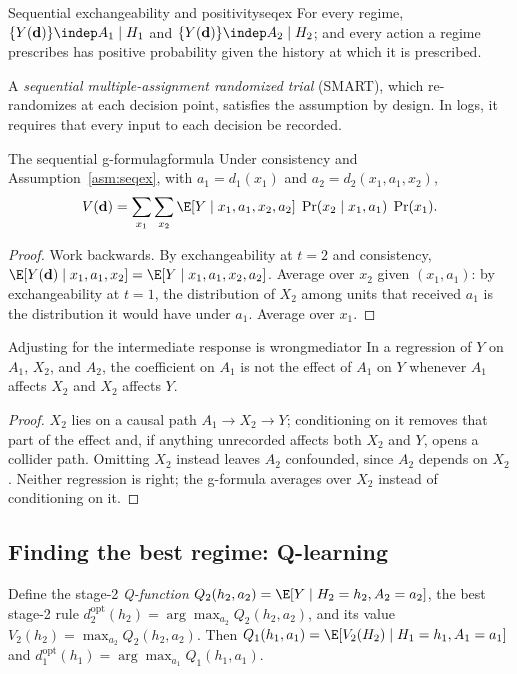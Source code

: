 \documentclass[11pt]{article}
\begin{document}
\begin{assum}{Sequential exchangeability and positivity}{seqex}
For every regime, $\{Y(\mathbf d)\} \indep A_1 \mid H_1$ and $\{Y(\mathbf d)\} \indep A_2 \mid H_2$; and every action a regime prescribes
has positive probability given the history at which it is prescribed.
\end{assum}

A \emph{sequential multiple-assignment randomized trial} (SMART), which re-randomizes at each decision point, satisfies the
assumption by design. In logs, it requires that every input to each decision be recorded.

\begin{prop}{The sequential g-formula}{gformula}
Under consistency and Assumption~\ref{asm:seqex}, with $a_1 = d_1(x_1)$ and $a_2 = d_2(x_1, a_1, x_2)$,
\[
  V(\mathbf d) = \sum_{x_1}\sum_{x_2} \E[Y \mid x_1, a_1, x_2, a_2]\;\Pr(x_2 \mid x_1, a_1)\;\Pr(x_1).
\]
\end{prop}
\begin{proof}
Work backwards. By exchangeability at $t = 2$ and consistency,
$\E[Y(\mathbf d) \mid x_1, a_1, x_2] = \E[Y \mid x_1, a_1, x_2, a_2]$. Average over $x_2$ given $(x_1, a_1)$: by exchangeability at
$t = 1$, the distribution of $X_2$ among units that received $a_1$ is the distribution it would have under $a_1$. Average
over $x_1$.
\end{proof}

\begin{prop}{Adjusting for the intermediate response is wrong}{mediator}
In a regression of $Y$ on $A_1$, $X_2$, and $A_2$, the coefficient on $A_1$ is not the effect of $A_1$ on $Y$ whenever $A_1$
affects $X_2$ and $X_2$ affects $Y$.
\end{prop}
\begin{proof}
$X_2$ lies on a causal path $A_1 \to X_2 \to Y$; conditioning on it removes that part of the effect and, if
anything unrecorded affects both $X_2$ and $Y$, opens a collider path. Omitting $X_2$ instead leaves $A_2$ confounded,
since $A_2$ depends on $X_2$. Neither regression is right; the g-formula averages over $X_2$ instead of conditioning on it.
\end{proof}

\subsection{Finding the best regime: Q-learning}

Define the stage-2 \emph{Q-function} $Q_2(h_2, a_2) = \E[Y \mid H_2 = h_2, A_2 = a_2]$, the best stage-2 rule
$d_2^{\text{opt}}(h_2) = \arg\max_{a_2} Q_2(h_2, a_2)$, and its value $V_2(h_2) = \max_{a_2} Q_2(h_2, a_2)$. Then
$Q_1(h_1, a_1) = \E[V_2(H_2) \mid H_1 = h_1, A_1 = a_1]$ and $d_1^{\text{opt}}(h_1) = \arg\max_{a_1} Q_1(h_1, a_1)$.
\end{document}

